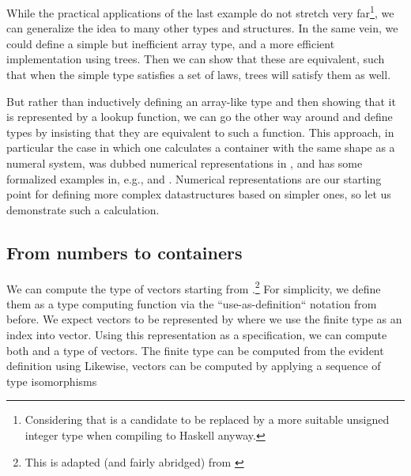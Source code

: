While the practical applications of the last example do not stretch very far\footnote{Considering that  is a candidate to be replaced by a more suitable unsigned integer type when compiling to Haskell anyway.}, we can generalize the idea to many other types and structures. In the same vein, we could define a simple but inefficient array type, and a more efficient implementation using trees. Then we can show that these are equivalent, such that when the simple type satisfies a set of laws, trees will satisfy them as well. %

But rather than inductively defining an array-like type and then showing that it is represented by a lookup function, we can go the other way around and define types by insisting that they are equivalent to such a function. This approach, in particular the case in which one calculates a container with the same shape as a numeral system, was dubbed numerical representations in \cite{purelyfunctional}, and has some formalized examples in, e.g., \cite{calcdata} and \cite{progorn}. Numerical representations are our starting point for defining more complex datastructures based on simpler ones, so let us demonstrate such a calculation. 

\subsection{From numbers to containers}\label{ssec:numrep}
We can compute the type of vectors starting from \bN{}.\footnote{This is adapted (and fairly abridged) from \cite{calcdata}} For simplicity, we define them as a type computing function via the ``use-as-definition`` notation from before. We expect vectors to be represented by 
where we use the finite type  as an index into vector. Using this representation as a specification, we can compute both  and a type of vectors. The finite type can be computed from the evident definition
using
Likewise, vectors can be computed by applying a sequence of type isomorphisms

